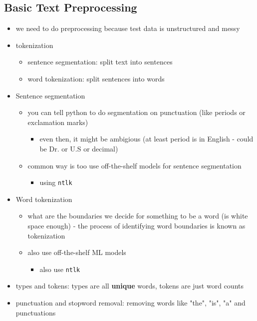 \documentclass[10.5pt,a4paper, fleqn, dvipsnames]{article}
\begin{document}
\subsection*{Basic Text Preprocessing}
\begin{itemize}
    \item we need to do preprocessing because test data is unstructured and messy
    \item tokenization
    \begin{itemize}
        \item sentence segmentation: split text into sentences
        \item word tokenization: split sentences into words
    \end{itemize}
    \item Sentence segmentation
    \begin{itemize}
        \item you can tell python to do segmentation on punctuation (like periods or exclamation marks)
        \begin{itemize}[leftmargin = 2em]
            \item even then, it might be ambigious (at least period is in English - could be Dr. or U.S or decimal)
        \end{itemize}
        \item common way is too use off-the-shelf models for sentence segmentation
        \begin{itemize}[leftmargin = 2em]
            \item using \lstinline{ntlk}
        \end{itemize}
    \end{itemize}
    \item Word tokenization
    \begin{itemize}
        \item what are the boundaries we decide for something to be a word (is white space enough) - the process of identifying word boundaries is known as tokenization
        \item also use off-the-shelf ML models 
        \begin{itemize}[leftmargin = 2em]
            \item also use \lstinline{ntlk}
        \end{itemize}
    \end{itemize}
    \item types and tokens: types are all \textbf{unique} words, tokens are just word counts
    \item punctuation and stopword removal: removing words like "the", "is", "a" and punctuations

\end{itemize}
\end{document}
